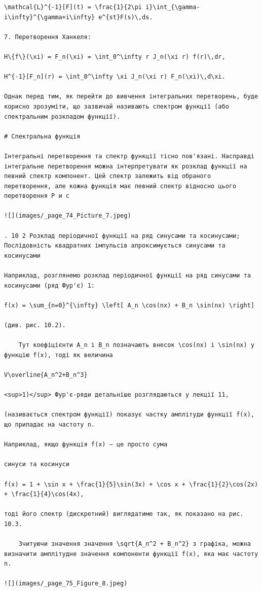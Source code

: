 \documentclass[
  ukrainian,
]{article}
\begin{document}
\begin{verbatim}
\mathcal{L}^{-1}[F](t) = \frac{1}{2\pi i}\int_{\gamma-i\infty}^{\gamma+i\infty} e^{st}F(s)\,ds.

7. Перетворення Ханкеля:

H\{f\}(\xi) = F_n(\xi) = \int_0^\infty r J_n(\xi r) f(r)\,dr,

H^{-1}[F_n](r) = \int_0^\infty \xi J_n(\xi r) F_n(\xi)\,d\xi.

Однак перед тим, як перейти до вивчення інтегральних перетворень, буде корисно зрозуміти, що зазвичай називають спектром функції (або спектральним розкладом функції).

# Спектральна функція

Інтегральні перетворення та спектр функції тісно пов'язані. Насправді інтегральне перетворення можна інтерпретувати як розклад функції на певний спектр компонент. Цей спектр залежить від обраного перетворення, але кожна функція має певний спектр відносно цього перетворення Р и с

![](images/_page_74_Picture_7.jpeg)

. 10 2 Розклад періодичної функції на ряд синусами та косинусами; Послідовність квадратних імпульсів апроксимується синусами та косинусами

Наприклад, розглянемо розклад періодичної функції на ряд синусами та косинусами (ряд Фур'є) 1:

f(x) = \sum_{n=0}^{\infty} \left[ A_n \cos(nx) + B_n \sin(nx) \right]

(див. рис. 10.2).

    Тут коефіцієнти A_n і B_n позначають внесок \cos(nx) і \sin(nx) у функцію f(x), тоді як величина

V\overline{A_n^2+B_n^3}

<sup>1)</sup> Фур'є-ряди детальніше розглядаються у лекції 11,

(називається спектром функції) показує частку амплітуди функції f(x), що припадає на частоту n.

Наприклад, якщо функція f(x) — це просто сума

синуси та косинуси

f(x) = 1 + \sin x + \frac{1}{5}\sin(3x) + \cos x + \frac{1}{2}\cos(2x) + \frac{1}{4}\cos(4x),

тоді його спектр (дискретний) виглядатиме так, як показано на рис. 10.3.

    Зчитуючи значення значення \sqrt{A_n^2 + B_n^2} з графіка, можна визначити амплітудне значення компоненти функції f(x), яка має частоту n.

![](images/_page_75_Figure_8.jpeg)


\end{verbatim}
\end{document}
